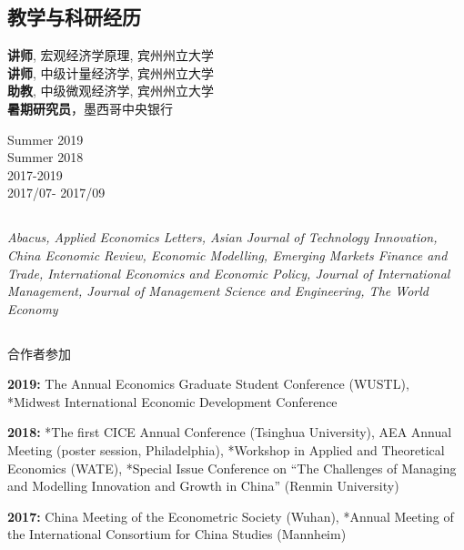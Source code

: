 \documentclass[letterpaper]{article}
\begin{document}
{\subsection*{\bf 教学与科研经历}
\begin{minipage}{0.8\linewidth}
  \textbf{讲师}, 宏观经济学原理, 宾州州立大学 \\
  \textbf{讲师}, 中级计量经济学, 宾州州立大学 \\
  \textbf{助教}, 中级微观经济学, 宾州州立大学 \\
  \textbf{暑期研究员}，墨西哥中央银行
\end{minipage}
\begin{minipage}{0.2\linewidth}
    Summer 2019 \\
    Summer 2018 \\
   2017-2019  \\
  2017/07- 2017/09
\end{minipage}

\subsection*{{}}
      \textit{Abacus, Applied Economics Letters, Asian Journal of Technology Innovation, China Economic Review, Economic Modelling, Emerging Markets Finance and Trade, International Economics and Economic Policy, Journal of International Management, Journal of Management Science and Engineering, The World Economy}

\subsection*{{}}
{\footnotesize * 合作者参加}
\vspace{1em}

\textbf{2019:} The  Annual Economics Graduate Student Conference (WUSTL), *Midwest International Economic Development Conference

\vspace{0.5em}
\textbf{2018:} *The first CICE Annual Conference (Tsinghua University), AEA Annual Meeting (poster session, Philadelphia), *Workshop in Applied and Theoretical Economics (WATE), *Special Issue Conference on “The Challenges of Managing and Modelling Innovation and Growth in China” (Renmin University)

\vspace{0.5em}
\textbf{2017:} China Meeting of the Econometric Society (Wuhan), *Annual Meeting of the International Consortium for China Studies (Mannheim)

}
\end{document}
